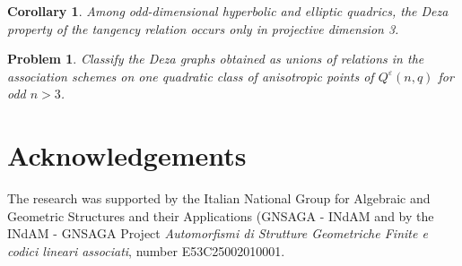 \documentclass{article}
\theoremstyle{plain}
\newtheorem{cor}[thm]{Corollary}
\newtheorem{prob}[thm]{Problem}
\begin{document}
\begin{cor}
Among odd-dimensional hyperbolic and elliptic quadrics, the Deza property of the tangency relation occurs only in projective dimension 3.
\end{cor}

\begin{prob}
Classify the Deza graphs obtained as unions of relations in the
association schemes on one quadratic class of anisotropic points of
$Q^\varepsilon(n,q)$ for odd $n>3$.
\end{prob}

\section*{Acknowledgements}
The research was supported by the Italian National Group for Algebraic and Geometric Structures and their Applications (GNSAGA - INdAM and by the INdAM - GNSAGA Project \emph{Automorfismi di Strutture Geometriche Finite e codici lineari associati}, number E53C25002010001.
\end{document}

